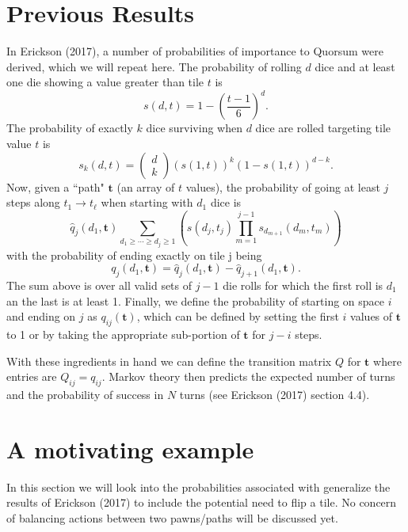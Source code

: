 \documentclass[letterpaper,11pt]{article}
\begin{document}
\section{Previous Results}
In Erickson (2017), a number of probabilities of importance to Quorsum
were derived, which we will
repeat here.  The probability of rolling $d$ dice and at least one die showing
a value greater than tile $t$ is
\begin{equation}
	s\left(d,t\right) = 1-\left(\frac{t-1}{6}\right)^d.
\end{equation}
The probability of exactly $k$ dice surviving when $d$ dice are rolled targeting
tile value $t$ is
\begin{equation}
	s_k\left(d,t\right)=\left(
	\begin{array}{c}
		d \\
		k
	\end{array} \right) \left(s\left(1,t\right)\right)^k
	\left(1-s\left(1,t\right)\right)^{d-k}.
\end{equation}
Now, given a ``path" $\mathbf{t}$ (an array of $t$ values), the probability of
going at least $j$ steps along $t_1 \rightarrow t_\ell$ when starting with
$d_1$ dice is
\begin{equation}
	\hat{q}_j\left(d_1,\mathbf{t}\right) \sum_{d_1\geq\cdots\geq d_j\geq 1}
	\left( s\left(d_j,t_j\right)
	\prod_{m=1}^{j-1} s_{d_{m+1}}\left(d_m,t_m\right)\right)
\end{equation}
with the probability of ending exactly on tile j being
\begin{equation}
	q_j\left(d_1,\mathbf{t}\right)= \hat{q}_j\left(d_1,\mathbf{t}\right) -
	\hat{q}_{j+1}\left(d_1,\mathbf{t}\right).
\end{equation}
The sum above is over all valid sets of $j-1$ die rolls for which the first roll
is $d_1$ an the last is at least 1.  Finally, we define the probability of
starting on space $i$ and ending on $j$ as $q_{ij}(\mathbf{t})$, which can be
defined by setting the first $i$ values of $\mathbf{t}$ to 1 or by taking the
appropriate sub-portion of $\mathbf{t}$ for $j-i$ steps.

With these ingredients in hand we can define the transition matrix $Q$ for
$\mathbf{t}$ where entries are $Q_{ij}=q_{ij}$.  Markov theory then predicts
the expected number of turns and the probability of success in $N$ turns (see
Erickson (2017) section 4.4).  

\section{A motivating example}
In this section we will look into the probabilities associated with  generalize the results of Erickson (2017) to include
the potential need to flip a tile.  No concern of balancing actions between two
pawns/paths will be discussed yet.
\end{document}
